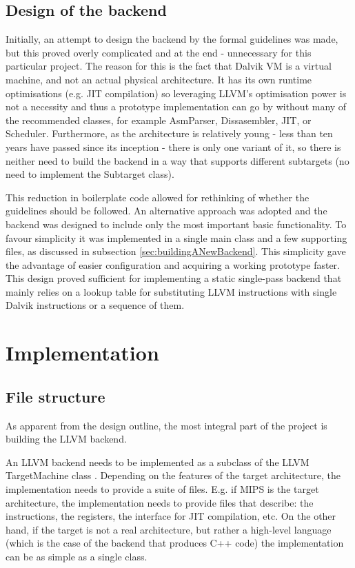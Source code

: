 \documentclass[parskip]{cs4rep}
\begin{document}
\subsection{Design of the backend} \label{sec:designOfTheBackend}

Initially, an attempt to design the backend by the formal guidelines\cite{P8} was made, but this proved overly complicated and at the end - unnecessary for this particular project. The reason for this is the fact that Dalvik VM is a virtual machine, and not an actual physical architecture. It has its own runtime optimisations (e.g. JIT compilation) so leveraging LLVM's optimisation power is not a necessity and thus a prototype implementation can go by without many of the recommended classes, for example AsmParser, Dissasembler, JIT, or Scheduler. Furthermore, as the architecture is relatively young - less than ten years have passed since its inception - there is only one variant of it, so there is neither need to build the backend in a way that supports different subtargets (no need to implement the Subtarget class).

This reduction in boilerplate code allowed for rethinking of whether the guidelines should be followed. An alternative approach was adopted and the backend was designed to include only the most important basic functionality. To favour simplicity it was implemented in a single main class and a few supporting files, as discussed in subsection \ref{sec:buildingANewBackend}. This simplicity gave the advantage of easier configuration and acquiring a working prototype faster. This design proved sufficient for implementing a static single-pass backend that mainly relies on a lookup table for substituting LLVM instructions with single Dalvik instructions or a sequence of them.

\section{Implementation} \label{sec:Implementation}

\subsection{File structure}

As apparent from the design outline, the most integral part of the project is building the LLVM backend.

An LLVM backend needs to be implemented as a subclass of the LLVM TargetMachine class \cite{P8}. Depending on the features of the target architecture, the implementation needs to provide a suite of files. E.g. if MIPS is the target architecture, the implementation needs to provide files that describe: the instructions, the registers, the interface for JIT compilation, etc. On the other hand, if the target is not a real architecture, but rather a high-level language (which is the case of the backend that produces C++ code) the implementation can be as simple as a single class.
\end{document}
